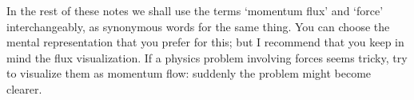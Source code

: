 \bigskip

In the rest of these notes we shall use the terms \enquote*{momentum flux} and \enquote*{force} interchangeably, as synonymous words for the same thing. You can choose the mental representation that you prefer for this; but I recommend that you keep in mind the flux visualization. If a physics problem involving forces seems tricky, try to visualize them as momentum flow: suddenly the problem might become clearer.




%
%
